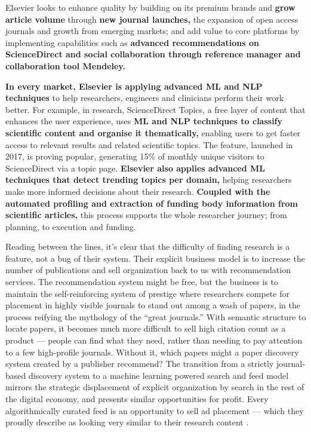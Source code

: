 \begin{leftbar}
Elsevier looks to enhance quality by building on its premium brands and
\textbf{grow article volume} through \textbf{new journal launches,} the
expansion of open access journals and growth from emerging markets; and
add value to core platforms by implementing capabilities such as
\textbf{advanced recommendations on ScienceDirect and social
collaboration through reference manager and collaboration tool
Mendeley.}

\textbf{In every market, Elsevier is applying advanced ML and NLP
techniques} to help researchers, engineers and clinicians perform their
work better. For example, in research, ScienceDirect Topics, a free
layer of content that enhances the user experience, uses \textbf{ML and
NLP techniques to classify scientific content and organise it
thematically,} enabling users to get faster access to relevant results
and related scientific topics. The feature, launched in 2017, is proving
popular, generating 15\% of monthly unique visitors to ScienceDirect via
a topic page. \textbf{Elsevier also applies advanced ML techniques that
detect trending topics per domain,} helping researchers make more
informed decisions about their research. \textbf{Coupled with the
automated profiling and extraction of funding body information from
scientific articles,} this process supports the whole researcher
journey; from planning, to execution and funding. \citep{RELXAnnualReport2019} 
\end{leftbar}

Reading between the lines, it's clear that the difficulty of finding
research is a feature, not a bug of their system. Their explicit
business model is to increase the number of publications and sell
organization back to us with recommendation services. The recommendation
system might be free, but the business is to maintain
the self-reinforcing system of prestige where researchers compete for
placement in highly visible journals to stand out among a wash of
papers, in the process reifying the mythology \citep{brembsPrestigiousScienceJournals2018}  of the ``great journals.''
With semantic structure to locate papers, it becomes much more difficult
to sell high citation count as a product --- people can find what they
need, rather than needing to pay attention to a few high-profile
journals. Without it, which papers might a paper discovery system
created by a publisher recommend? The transition from a strictly
journal-based discovery system to a machine learning powered search and
feed model mirrors the strategic displacement of explicit organization
by search in the rest of the digital economy, and presents similar
opportunities for profit. Every algorithmically curated feed is an
opportunity to sell ad placement --- which they
proudly describe as looking very similar to their research content \citep{springernatureBrandedContent, elsevier360AdvertisingSolutions} .

